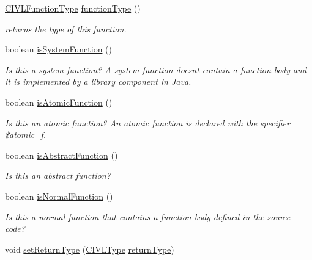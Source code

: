 \begin{DoxyCompactItemize}
\hyperlink{interfaceedu_1_1udel_1_1cis_1_1vsl_1_1civl_1_1model_1_1IF_1_1type_1_1CIVLFunctionType}{C\+I\+V\+L\+Function\+Type} \hyperlink{interfaceedu_1_1udel_1_1cis_1_1vsl_1_1civl_1_1model_1_1IF_1_1CIVLFunction_a4efffef219ee1a50ee40b121c6a16176}{function\+Type} ()
\begin{DoxyCompactList}\small\item\em returns the type of this function. \end{DoxyCompactList}\item 
boolean \hyperlink{interfaceedu_1_1udel_1_1cis_1_1vsl_1_1civl_1_1model_1_1IF_1_1CIVLFunction_a743bde028b46aca9173b510d4fcf3c60}{is\+System\+Function} ()
\begin{DoxyCompactList}\small\item\em Is this a system function? \hyperlink{structA}{A} system function doesn\textquotesingle{}t contain a function body and it is implemented by a library component in Java. \end{DoxyCompactList}\item 
boolean \hyperlink{interfaceedu_1_1udel_1_1cis_1_1vsl_1_1civl_1_1model_1_1IF_1_1CIVLFunction_a6fbfd5ca47886e87818683079f5e7f87}{is\+Atomic\+Function} ()
\begin{DoxyCompactList}\small\item\em Is this an atomic function? An atomic function is declared with the specifier {\ttfamily \$atomic\+\_\+f}. \end{DoxyCompactList}\item 
boolean \hyperlink{interfaceedu_1_1udel_1_1cis_1_1vsl_1_1civl_1_1model_1_1IF_1_1CIVLFunction_a64629127aacc17fa4fb89a3723ffee26}{is\+Abstract\+Function} ()
\begin{DoxyCompactList}\small\item\em Is this an abstract function? \end{DoxyCompactList}\item 
boolean \hyperlink{interfaceedu_1_1udel_1_1cis_1_1vsl_1_1civl_1_1model_1_1IF_1_1CIVLFunction_aaf0ecbe47ddb58c01b0c1e6b015dcdf9}{is\+Normal\+Function} ()
\begin{DoxyCompactList}\small\item\em Is this a normal function that contains a function body defined in the source code? \end{DoxyCompactList}\item 
void \hyperlink{interfaceedu_1_1udel_1_1cis_1_1vsl_1_1civl_1_1model_1_1IF_1_1CIVLFunction_ab9b07bc09532110b5a125f936a6baf74}{set\+Return\+Type} (\hyperlink{interfaceedu_1_1udel_1_1cis_1_1vsl_1_1civl_1_1model_1_1IF_1_1type_1_1CIVLType}{C\+I\+V\+L\+Type} \hyperlink{interfaceedu_1_1udel_1_1cis_1_1vsl_1_1civl_1_1model_1_1IF_1_1CIVLFunction_adf5138531beb65661edfe7ed1704f621}{return\+Type})

\end{DoxyCompactItemize}

